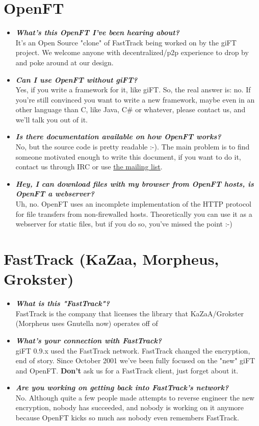 \documentclass[10pt]{article}
\newcommand{\question}[1]{\item\textbf{\emph{#1}}}
\begin{document}
\section{OpenFT} 
\begin{itemize}

\question {What's this OpenFT I've been hearing about?}\\
It's an Open Source "clone" of FastTrack being worked on by the
giFT project. We welcome anyone with decentralized/p2p experience
to drop by and poke around at our design. 
 
\question {Can I use OpenFT without giFT?}\\
Yes, if you write a framework for it, like giFT. So, the real
answer is: no. If you're still convinced you want to write a new
framework, maybe even in an other language than C, like Java, C\#
or whatever, please contact us, and we'll talk you out of it.

\question {Is there documentation available on how OpenFT works?}\\
No, but the source code is pretty readable :-). The main problem
is to find someone motivated enough to write this document, if you
want to do it, contact us through IRC or use
\href{http://lists.sourceforge.net/lists/listinfo/gift-openft}{the
mailing list}.

\question {Hey, I can download files with my browser from OpenFT
hosts, is OpenFT a webserver?}\\
Uh, no. OpenFT uses an incomplete implementation of the HTTP
protocol for file transfers from non-firewalled hosts.
Theoretically you can use it as a webserver for static files, but
if you do so, you've missed the point :-)


\end{itemize}
 
\section{FastTrack (KaZaa, Morpheus, Grokster)}
\begin{itemize}

\question {What is this "FastTrack"?}\\
FastTrack is the company that licenses the library that
KaZaA/Grokster (Morpheus uses Gnutella now) operates off of
 
\question {What's your connection with FastTrack?}\\
giFT 0.9.x used the FastTrack network. FastTrack changed the
encryption, end of story. Since October 2001 we've been fully
focused on the "new" giFT and OpenFT. \textbf{Don't} ask us for a
FastTrack client, just forget about it.

\question {Are you working on getting back into FastTrack's network?}\\
No. Although quite a few people made attempts to reverse engineer
the new encryption, nobody has succeeded, and nobody is working on
it anymore because OpenFT kicks so much ass nobody even remembers
FastTrack. 
 
\end{itemize}
\end{document}
